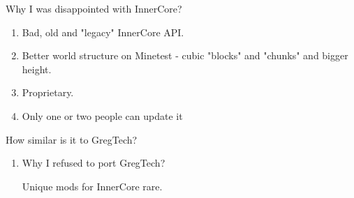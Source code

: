 \documentclass[12pt]{article}
\begin{document}
    
    Why I was disappointed with InnerCore?

    \begin{enumerate}[i]
    \item Bad, old and "legacy" InnerCore API.
    \item Better world structure on Minetest - cubic "blocks" and "chunks" and bigger height.
    \item Proprietary. 
    \item Only one or two people can update it
    \end{enumerate}

    How similar is it to GregTech?

    \begin{enumerate}[i]
    Pretty similar, but much things has been changed for realism, flexibility and ideas inspired by some software.

    \item Why I refused to port GregTech?
    
    Unique mods for InnerCore rare.

    \end{enumerate}
\end{document}
